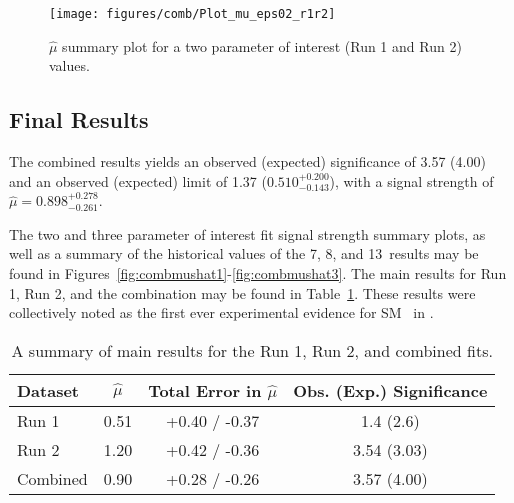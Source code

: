 \begin{figure}[!htbp]\captionsetup{justification=centering}
  \begin{center}
  \texttt{[image: figures/comb/Plot\_mu\_eps02\_r1r2]}
  \caption{$\hat{\mu}$ summary plot for a two parameter of interest (Run 1 and Run 2) values.}
  \label{fig:combmushat6}
  \end{center}
\end{figure}

\subsection{Final Results}
The combined results yields an observed (expected) significance of 3.57 (4.00) and an observed (expected) limit of 1.37 ($0.510^{+0.200}_{-0.143}$), with a signal strength of $\hat{\mu}=0.898^{+0.278}_{-0.261}$.

The two and three parameter of interest fit signal strength summary plots, as well as a summary of the historical values of the 7, 8, and 13 \TeV\,results may be found in Figures~\ref{fig:combmushat1}-\ref{fig:combmushat3}.  The main results for Run 1, Run 2, and the combination may be found in Table~\ref{tableCombresykts}.  These results were collectively noted as the first ever experimental evidence for SM \vhbb\, in \cite{paper}.

\begin{table}[!htbp]\captionsetup{justification=centering}
\caption{A summary of main results for the Run 1, Run 2, and combined fits.}
\begin{center}
\begin{tabular}{lccc} \hline\hline
Dataset & $\hat{\mu}$ & Total Error in $\hat{\mu}$ & Obs. (Exp.) Significance \\
\hline
Run 1 & 0.51 & +0.40 / -0.37 & 1.4 (2.6)\\
Run 2 & 1.20 & +0.42 / -0.36 & 3.54 (3.03)\\
Combined & 0.90 & +0.28 / -0.26 & 3.57 (4.00)\\
\hline\hline
\end{tabular}
\label{tableCombresykts}
\end{center}
\end{table}


